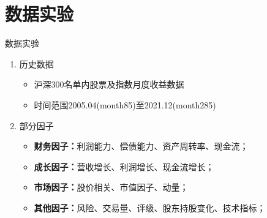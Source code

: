 \documentclass[CJK,aspectratio=43]{beamer}  %
\begin{document}
\section{数据实验}
\begin{frame}{数据实验}
	\begin{enumerate}
		\item 历史数据
		\begin{itemize}
			\item 沪深300名单内股票及指数月度收益数据
			\item 时间范围2005.04(month85)至2021.12(month285)
		\end{itemize}
		\item 部分因子
		\begin{itemize}
			\item \textbf{财务因子：}利润能力、偿债能力、资产周转率、现金流；
			\item \textbf{成长因子：}营收增长、利润增长、现金流增长；
			\item \textbf{市场因子：}股价相关、市值因子、动量；
			\item \textbf{其他因子：}风险、交易量、评级、股东持股变化、技术指标；
		\end{itemize}
	\end{enumerate}
	\begin{table}[htbp]
		\centering
		\label{tab:factors}%
		\caption{Factors}
	\end{table}%
\end{frame}
\end{document}
